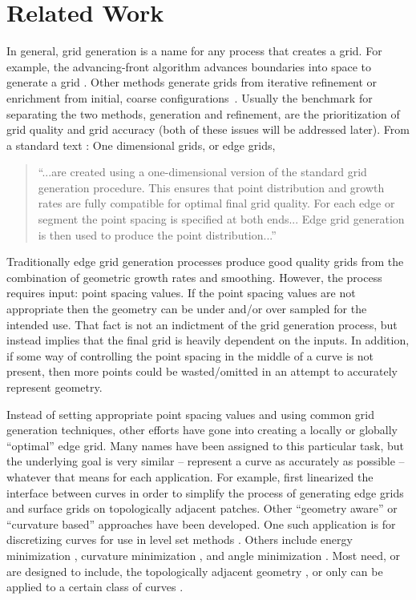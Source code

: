 \section{Related Work}
In general, grid generation is a name for any process that creates a grid.  
For example, the advancing-front algorithm advances boundaries into space 
to generate a grid \cite{lohner88}.  Other methods generate grids from 
iterative refinement or enrichment from initial, coarse 
configurations~\cite{shewchuk98,shewchuk02}.
Usually the benchmark for separating the two 
methods, generation and refinement, are the prioritization of grid quality and grid accuracy (both of these issues will be addressed later).  From a standard text \cite{thompson98}: One dimensional grids, or edge grids, 

\begin{quotation}
\noindent ``...are created using a one-dimensional version of the standard grid generation procedure.  This ensures that point distribution and growth rates are fully compatible for optimal final grid quality.  For each edge or segment the point spacing is specified at both ends... Edge grid generation is then used to produce the point distribution...''
\end{quotation} 

\noindent Traditionally edge grid generation processes produce good quality grids from the combination of geometric growth rates and smoothing.  However, the process requires input: point spacing values.  If the point spacing values are not appropriate then the geometry can be under and/or over sampled for the intended use.  That fact is not an indictment of the grid generation process, but instead implies that the final grid is heavily dependent on the inputs.  In addition, if some way of controlling the point spacing in the middle of a curve is not present, then more points could be wasted/omitted in an attempt to accurately represent geometry.

Instead of setting appropriate point spacing values and using common grid generation techniques, other efforts have gone into creating a locally or globally ``optimal'' edge grid.  Many names have been assigned to this particular task, but the underlying goal is very similar -- represent a curve as accurately as possible -- whatever that means for each application.  For example, \cite{laug04} first linearized the interface between curves in order to simplify the process of generating edge grids and surface grids on topologically adjacent patches.  Other ``geometry aware'' or ``curvature based'' approaches have been developed.  One such application is for discretizing curves for use in level set methods \cite{macklin06}.  Others include energy minimization \cite{hofer04}, curvature minimization \cite{zehiry10}, and angle minimization \cite{ebeida10}. Most need, or are designed to include, the topologically adjacent geometry \cite{quadros04,cabello03,cunha97}, or only can be applied to a certain class of curves \cite{cuilliere97}.
